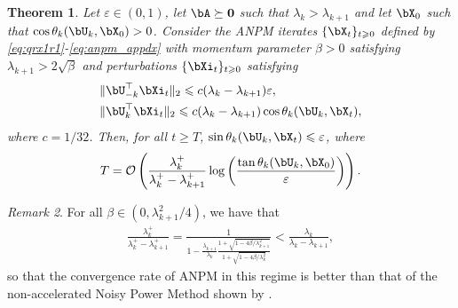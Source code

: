 \documentclass{article}
\theoremstyle{plain}
\newtheorem{theorem}{Theorem}[section]
\theoremstyle{definition}
\theoremstyle{remark}
\newtheorem{remark}[theorem]{Remark}
\begin{document}
\begin{theorem}\label{th:anpm_smallbeta}
  Let $\varepsilon \in (0,1)$, let $\bA\succeq\mathbf{0}$ such that $\lambda_k>\lambda_{k+1}$ and let $\bX_0$ such that $\cos\theta_k(\bU_k,\bX_0) >0$. Consider the ANPM iterates $\{\bX_t\}_{t\geqslant 0}$ defined by \eqref{eq:qrx1r1}-\eqref{eq:anpm_appdx} with momentum parameter $\beta > 0$ satisfying $\lambda_{k+1} > 2\sqrt{\beta}$ and perturbations $\{\bXi_t\}_{t\geqslant 0}$ satisfying 
  \begin{align}
    & \Vert \bU_{-k}^\top \bXi_t \Vert_2 \leqslant c(\lambda_k-\lambda_{k+1})\varepsilon, \label{eq:noisecond_alpha}\\
    & \Vert \bU_{k}^\top \bXi_t \Vert_2 \leqslant c(\lambda_k-\lambda_{k+1})\cos\theta_k(\bU_k, \bX_t), \label{eq:noisecond_beta}
  \end{align}
  where $c = 1/32$. Then, for all $t \geqslant T$, $\sin\theta_k(\bU_k, \bX_t) \leqslant \varepsilon$, where
  \begin{align*}
      T  = \mathcal{O}\left({\frac{\lambda_k^+}{\lambda_k^+ - \lambda_{k+1}^+}} \log\left(\frac{\tan\theta_k(\bU_k, \bX_0)}{\varepsilon}\right)\right).
  \end{align*}
\end{theorem}

\begin{remark}
  For all $\beta \in (0, \lambda_{k+1}^2/4)$, we have that 
  \begin{align*}
    \frac{\lambda_k^+}{\lambda_k^+ - \lambda_{k+1}^+} = \frac{1}{1 - \frac{\lambda_{k+1}}{\lambda_k}\frac{1 + \sqrt{1 - 4\beta/\lambda_{k+1}^2}}{1 + \sqrt{1 - 4\beta/\lambda_k^2}}} < \frac{\lambda_k}{\lambda_k-\lambda_{k+1}},
  \end{align*}
  so that the convergence rate of ANPM in this regime is better than that of the non-accelerated Noisy Power Method shown by \citet{hardt14}.
\end{remark}
\end{document}

